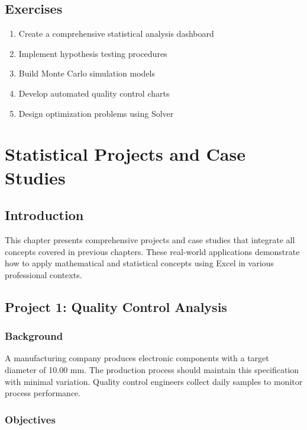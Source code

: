 \documentclass[12pt,a4paper]{book}
\begin{document}
{{\section{Exercises}

\begin{enumerate}
    \item Create a comprehensive statistical analysis dashboard
    \item Implement hypothesis testing procedures
    \item Build Monte Carlo simulation models
    \item Develop automated quality control charts
    \item Design optimization problems using Solver
\end{enumerate}

\chapter{Statistical Projects and Case Studies}

\section{Introduction}

This chapter presents comprehensive projects and case studies that integrate all concepts covered in previous chapters. These real-world applications demonstrate how to apply mathematical and statistical concepts using Excel in various professional contexts.

\section{Project 1: Quality Control Analysis}

\subsection{Background}

A manufacturing company produces electronic components with a target diameter of 10.00 mm. The production process should maintain this specification with minimal variation. Quality control engineers collect daily samples to monitor process performance.

\subsection{Objectives}

}}
\end{document}
